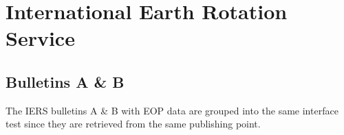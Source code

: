 \documentclass[dec_sum_main.tex]{subfiles}
\begin{document}

\pagebreak

\section{International Earth Rotation Service}

\subsection{Bulletins A \& B}
The IERS bulletins A \& B with EOP data are grouped into the same interface test since they are retrieved from the same publishing point. \newline

 \newline
\end{document}
